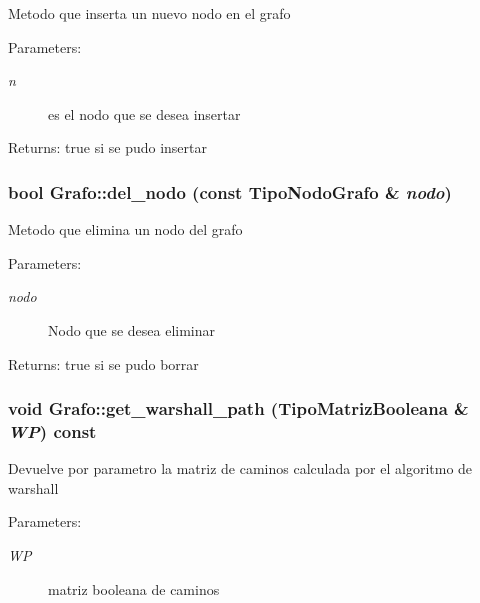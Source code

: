 Metodo que inserta un nuevo nodo en el grafo \begin{Desc}
\item[Parameters:]
\begin{description}
\item[{\em n}]es el nodo que se desea insertar \end{description}
\end{Desc}
\begin{Desc}
\item[Returns:]true si se pudo insertar \end{Desc}
\subsubsection{\setlength{\rightskip}{0pt plus 5cm}bool Grafo::del\_\-nodo (const {\bf TipoNodoGrafo} \& {\em nodo})}\label{classGrafo_63e6892c0bad12eb9c9d969462356ecf}


Metodo que elimina un nodo del grafo \begin{Desc}
\item[Parameters:]
\begin{description}
\item[{\em nodo}]Nodo que se desea eliminar \end{description}
\end{Desc}
\begin{Desc}
\item[Returns:]true si se pudo borrar \end{Desc}
\subsubsection{\setlength{\rightskip}{0pt plus 5cm}void Grafo::get\_\-warshall\_\-path ({\bf TipoMatrizBooleana} \& {\em WP}) const}\label{classGrafo_344e71ffc946fe568abd87be23081a94}


Devuelve por parametro la matriz de caminos calculada por el algoritmo de warshall \begin{Desc}
\item[Parameters:]
\begin{description}
\item[{\em WP}]matriz booleana de caminos \end{description}
\end{Desc}
